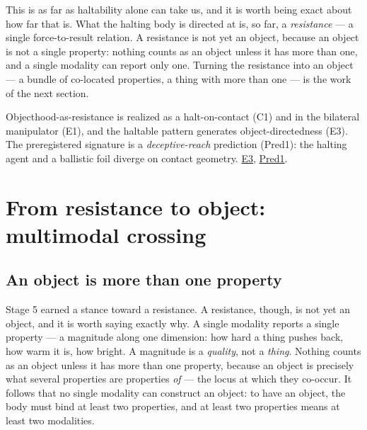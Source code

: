 \documentclass{article}
\newcommand{\rtdlink}[2]{\href{https://smn-lab.readthedocs.io/en/latest/#1}{#2}}
\begin{document}
This is as far as haltability alone can take us, and it is worth being
exact about how far that is.  What the halting body is directed at is, so
far, a \emph{resistance} --- a single force-to-result relation.  A
resistance is not yet an object, because an object is not a single
property: nothing counts as an object unless it has more than one, and a
single modality can report only one.  Turning the resistance into an
object --- a bundle of co-located properties, a thing with more than one
--- is the work of the next section.

\begin{benchbox}
Objecthood-as-resistance is realized as a halt-on-contact (C1) and in the
bilateral manipulator (E1), and the haltable pattern generates
object-directedness (E3).  The preregistered signature is a
\emph{deceptive-reach} prediction (Pred1): the halting agent and a
ballistic foil diverge on contact geometry.
\rtdlink{experiments/p6_haltability_aboutness/}{E3},
\rtdlink{experiments/sweep_pred1_haltability/}{Pred1}.
\end{benchbox}

\section{From resistance to object: multimodal crossing}\label{sec:object}

\subsection{An object is more than one property}\label{sec:object-principle}

Stage 5 earned a stance toward a resistance.  A resistance, though, is
not yet an object, and it is worth saying exactly why.  A single
modality reports a single property --- a magnitude along one dimension:
how hard a thing pushes back, how warm it is, how bright.  A magnitude is
a \emph{quality}, not a \emph{thing}.  Nothing counts as an object unless
it has more than one property, because an object is precisely what
several properties are properties \emph{of} --- the locus at which they
co-occur.  It follows that no single modality can construct an object: to
have an object, the body must bind at least two properties, and at least
two properties means at least two modalities.
\end{document}
